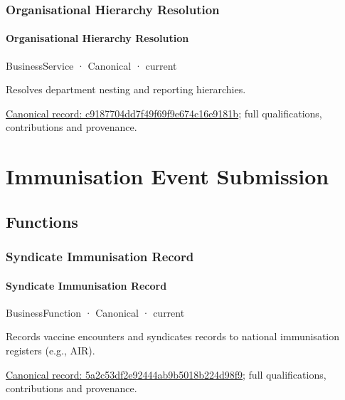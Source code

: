 \subsubsection{Organisational Hierarchy Resolution}

\paragraph{Organisational Hierarchy Resolution}

\label{element:c9187704dd7f49f69f9e674c16e9181b}
{\small BusinessService · Canonical · current}\par

Resolves department nesting and reporting hierarchies.


{\footnotesize \href{../../../../continuum/business/business-service/c9187704dd7f49f69f9e674c16e9181b.md}{Canonical record: c9187704dd7f49f69f9e674c16e9181b}; full qualifications, contributions and provenance.}\par
\section{Immunisation Event Submission}

\subsection{Functions}

\subsubsection{Syndicate Immunisation Record}

\paragraph{Syndicate Immunisation Record}

\label{element:5a2c53df2e92444ab9b5018b224d98f9}
{\small BusinessFunction · Canonical · current}\par

Records vaccine encounters and syndicates records to national immunisation registers (e.g., AIR).


{\footnotesize \href{../../../../continuum/business/business-function/5a2c53df2e92444ab9b5018b224d98f9.md}{Canonical record: 5a2c53df2e92444ab9b5018b224d98f9}; full qualifications, contributions and provenance.}\par
